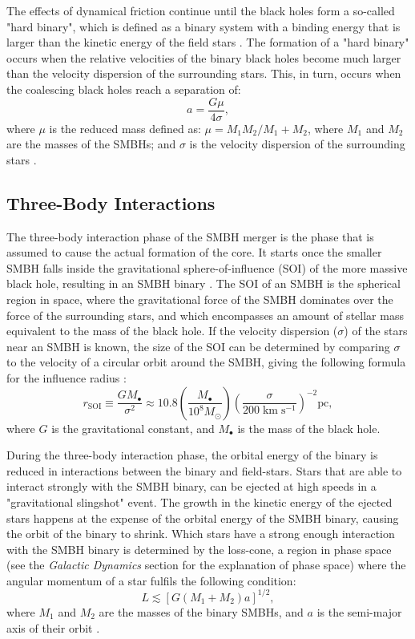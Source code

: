 \documentclass[english, oneside]{HYgradu}
\begin{document}
The effects of dynamical friction continue until the black holes form a so-called "hard binary", which is defined as a binary system with a binding energy that is larger than the kinetic energy of the field stars \citep{BinneyTremaine}. The formation of a "hard binary" occurs when the relative velocities of the binary black holes become much larger than the velocity dispersion of the surrounding stars. This, in turn, occurs when the coalescing black holes reach a separation of:
\begin{equation}
a = \frac{G\mu}{4\sigma},
\end{equation}
where $\mu$ is the reduced mass defined as: $\mu = M_1M_2 / M_1 + M_2$, where $M_1$ and $M_2$ are the masses of the SMBHs; and $\sigma$ is the velocity dispersion of the surrounding stars \citep{MerrittBook}.

\subsection{Three-Body Interactions}

The three-body interaction phase of the SMBH merger is the phase that is assumed to cause the actual formation of the core. It starts once the smaller SMBH falls inside the gravitational sphere-of-influence (SOI) of the more massive black hole, resulting in an SMBH binary \citep{MerrittBook}. The SOI of an SMBH is the spherical region in space, where the gravitational force of the SMBH dominates over the force of the surrounding stars, and which encompasses an amount of stellar mass equivalent to the mass of the black hole. If the velocity dispersion ($\sigma$) of the stars near an SMBH is known, the size of the SOI can be determined by comparing $\sigma$ to the velocity of a circular orbit around the SMBH, giving the following formula for the influence radius \citep{MerrittBook}:
\begin{equation}
r_\mathrm{SOI} \equiv \frac{GM_\bullet}{\sigma^2} \approx 10.8 \left( \frac{M_\bullet}{10^8 M_\odot} \right) \left( \frac{\sigma}{200 \; \mathrm{km \; s^{-1}}} \right)^{-2} \mathrm{pc},
\end{equation}
where $G$ is the gravitational constant, and $M_\bullet$ is the mass of the black hole. 

During the three-body interaction phase, the orbital energy of the binary is reduced in interactions between the binary and field-stars. Stars that are able to interact strongly with the SMBH binary, can be ejected at high speeds in a "gravitational slingshot" event. The growth in the kinetic energy of the ejected stars happens at the expense of the orbital energy of the SMBH binary, causing the orbit of the binary to shrink. Which stars have a strong enough interaction with the SMBH binary is determined by the loss-cone, a region in phase space (see the \textit{Galactic Dynamics} section for the explanation of phase space) where the angular momentum of a star fulfils the following condition:
\begin{equation}
L \lesssim \left[ G(M_1 + M_2) a \right]^{1/2}, \label{eq:loss-cone}
\end{equation}
where $M_1$ and $M_2$ are the masses of the binary SMBHs, and $a$ is the semi-major axis of their orbit \citep{BinneyTremaine}. 
\end{document}
